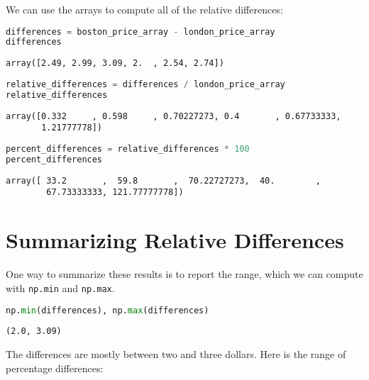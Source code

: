 We can use the arrays to compute all of the relative differences:

\begin{lstlisting}[language=Python]
differences = boston_price_array - london_price_array
differences
\end{lstlisting}

\begin{lstlisting}[]
array([2.49, 2.99, 3.09, 2.  , 2.54, 2.74])
\end{lstlisting}

\begin{lstlisting}[language=Python]
relative_differences = differences / london_price_array
relative_differences
\end{lstlisting}

\begin{lstlisting}[]
array([0.332     , 0.598     , 0.70227273, 0.4       , 0.67733333,
       1.21777778])
\end{lstlisting}

\begin{lstlisting}[language=Python]
percent_differences = relative_differences * 100
percent_differences
\end{lstlisting}

\begin{lstlisting}[]
array([ 33.2       ,  59.8       ,  70.22727273,  40.        ,
        67.73333333, 121.77777778])
\end{lstlisting}

\hypertarget{summarizing-relative-differences}{%
\section{Summarizing Relative
Differences}\label{summarizing-relative-differences}}

One way to summarize these results is to report the range, which we can
compute with \passthrough{\lstinline!np.min!} and
\passthrough{\lstinline!np.max!}.

\begin{lstlisting}[language=Python]
np.min(differences), np.max(differences)
\end{lstlisting}

\begin{lstlisting}[]
(2.0, 3.09)
\end{lstlisting}

The differences are mostly between two and three dollars. Here is the
range of percentage differences:


